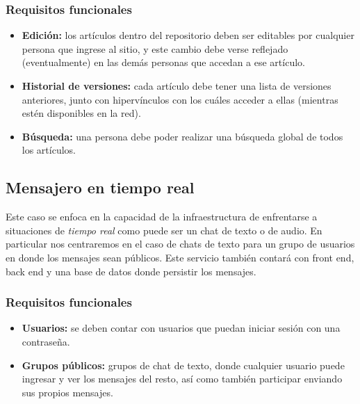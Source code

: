 \subsubsection{Requisitos funcionales}

\begin{itemize}
    \item \textbf{Edición:} los artículos dentro del repositorio deben ser editables por cualquier persona que ingrese al sitio, y este cambio debe verse reflejado (eventualmente) en las demás personas que accedan a ese artículo.
    \item \textbf{Historial de versiones:} cada artículo debe tener una lista de versiones anteriores, junto con hipervínculos con los cuáles acceder a ellas (mientras estén disponibles en la red).
    \item \textbf{Búsqueda:} una persona debe poder realizar una búsqueda global de todos los artículos.
\end{itemize}

\subsection{Mensajero en tiempo real}

Este caso se enfoca en la capacidad de la infraestructura de enfrentarse a situaciones de \textit{tiempo real} como puede ser un chat de texto o de audio. En particular nos centraremos en el caso de chats de texto para un grupo de usuarios en donde los mensajes sean públicos. Este servicio también contará con front end, back end y una base de datos donde persistir los mensajes.

\subsubsection{Requisitos funcionales}

\begin{itemize}
    \item \textbf{Usuarios:} se deben contar con usuarios que puedan iniciar sesión con una contraseña.
    \item \textbf{Grupos públicos:} grupos de chat de texto, donde cualquier usuario puede ingresar y ver los mensajes del resto, así como también participar enviando sus propios mensajes.
\end{itemize}
